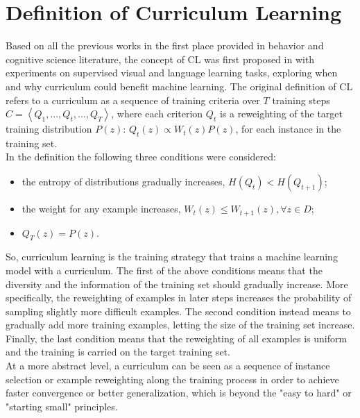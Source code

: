 \section{Definition of Curriculum Learning}\label{chapter:defCL}
Based on all the previous works in the first place provided in behavior and 
cognitive science literature, the concept of CL was first proposed in \cite{bengio2009curriculum} with 
experiments on supervised visual and language learning tasks, exploring when and why curriculum could benefit machine learning.
The original definition of CL refers to a curriculum as a sequence of training criteria 
over \(T\) training steps \( C = \left \langle Q_1, ..., Q_t, ..., Q_T \right \rangle\), where each  
criterion \(Q_t\) is a reweighting of the target training distribution \(P(z)\): \(Q_t(z) \propto W_t(z)P(z)\), for 
each instance in the training set.\\ In the definition the following three conditions were considered:
\begin{itemize}
    \item the entropy of distributions gradually increases, \(H(Q_t) < H(Q_{t+1})\);
    \item the weight for any example increases, \(W_t(z) \leq W_{t+1}(z),  \forall z \in D\);
    \item \(Q_T(z) = P(z)\).
\end{itemize}
So, curriculum learning is the training strategy that trains a machine learning model
with a curriculum. The first of the above conditions means that the diversity 
and the information of the training set should gradually increase. More specifically,
the reweighting of examples in later steps increases the probability of sampling slightly more difficult examples.
The second condition instead means to gradually add more training examples, letting the size of the training set increase. 
Finally, the last condition
means that the reweighting of all examples is uniform and the training is carried on the target training set.\\
At a more abstract level, a curriculum can be seen as a sequence of instance selection or example reweighting along the training process in order to achieve faster convergence or better generalization, 
which is beyond the "easy to hard" or "starting small" principles. 

